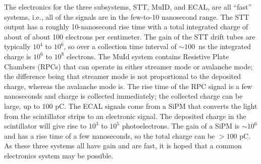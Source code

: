 The electronics for the three subsystems, STT, MuID, and ECAL, are all ``fast'' systems, 
i.e., all of the signals are %
in the few-to-10 nanosecond range.  The STT output has 
a roughly 10-nanosecond rise time with a total integrated charge of about of about 100 
electrons per centimeter.  The gain of the STT drift tubes are typically $10^4$ to $10^6$, 
so over a collection time interval of $\sim100$~ns
the integrated charge is  $10^6$ to $10^8$ electrons. 
The MuId system contains Resistive Plate Chambers (RPCs) that can operate 
in either streamer mode or avalanche mode; the difference 
being that streamer mode is not proportional to 
the deposited charge, whereas the avalanche mode 
is.  The rise time of the RPC signal is a few nanoseconds and charge is 
collected immediately; the collected charge can be large, up to 100 pC.  The ECAL 
signals come from a SiPM that converts the light from the 
scintillator strips to an electronic signal. The deposited charge in the scintillator 
will give rise to $10^3$ to $10^5$ photoelectrons.  The gain of a SiPM is $\sim10^6$ and 
has a rise time of a few nanoseconds, so the total charge can be $>100$ pC. As these 
three systems all have gain and are fast, it is hoped that a 
common electronics system may be possible. 

